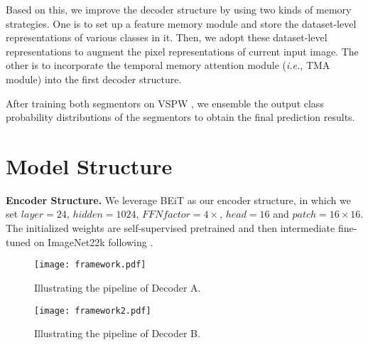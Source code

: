 \documentclass[10pt,twocolumn,letterpaper]{article}
\begin{document}
Based on this, we improve the decoder structure by using two kinds of memory strategies.
One is to set up a feature memory module and store the dataset-level representations of various classes in it. Then, we adopt these dataset-level representations to augment the pixel representations of current input image.
The other is to incorporate the temporal memory attention module (\emph{i.e.}, TMA module) \cite{wang2021temporal} into the first decoder structure.

After training both segmentors on VSPW \cite{miao2021vspw}, we ensemble the output class probability distributions of the segmentors to obtain the final prediction results.


\section{Model Structure} \label{structure}
\noindent \textbf{Encoder Structure.} We leverage BEiT \cite{bao2021beit} as our encoder structure, in which we set $layer=24$, $hidden=1024$, $FFN factor=4\times$, $head=16$ and $patch=16 \times 16$.
The initialized weights are self-supervised pretrained and then intermediate fine-tuned on ImageNet22k following \cite{bao2021beit}.

\begin{figure*}
\centering
\texttt{[image: framework.pdf]}
\caption{
   Illustrating the pipeline of Decoder A. 
}\label{framework}
\end{figure*}

\begin{figure*}
\centering
\texttt{[image: framework2.pdf]}
\caption{
   Illustrating the pipeline of Decoder B. 
}\label{framework2}
\end{figure*}
\end{document}
